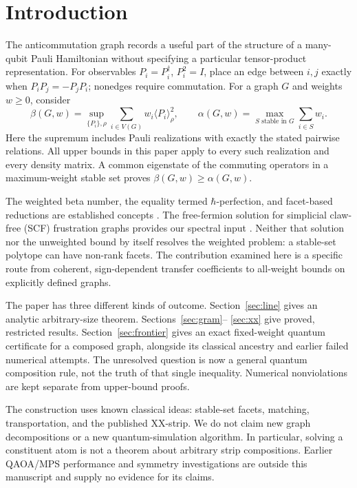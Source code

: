 \documentclass[11pt,a4paper]{article}
\theoremstyle{remark}\newtheorem{remark}[theorem]{Remark}
\newcommand{\ev}[1]{\langle#1\rangle_\rho}
\begin{document}
\section{Introduction}
The anticommutation graph records a useful part of the structure of a
many-qubit Pauli Hamiltonian without specifying a particular tensor-product
representation. For observables $P_i=P_i^\dagger$, $P_i^2=I$, place an edge
between $i,j$ exactly when $P_iP_j=-P_jP_i$; nonedges require commutation.
For a graph $G$ and weights $w\geq0$, consider
\begin{equation}\label{eq:beta}
 \beta(G,w)=\sup_{\{P_i\},\rho}\sum_{i\in V(G)}w_i\ev{P_i}^2,
 \qquad \alpha(G,w)=\max_{S\text{ stable in }G}\sum_{i\in S}w_i.
\end{equation}
Here the supremum includes Pauli realizations with exactly the stated
pairwise relations. All upper bounds in this paper apply to every such
realization and every density matrix. A common eigenstate of the commuting
operators in a maximum-weight stable set proves $\beta(G,w)\geq\alpha(G,w)$.

The weighted beta number, the equality termed $\hbar$-perfection, and
facet-based reductions are established concepts \cite{xu}. The
free-fermion solution for simplicial claw-free (SCF) frustration graphs
provides our spectral input \cite{cem}. Neither that solution nor the
unweighted bound by itself resolves the weighted problem: a stable-set
polytope can have non-rank facets. The contribution examined here is a
specific route from coherent, sign-dependent transfer coefficients to
all-weight bounds on explicitly defined graphs.

The paper has three different kinds of outcome. Section~\ref{sec:line}
gives an analytic arbitrary-size theorem. Sections~\ref{sec:gram}--
\ref{sec:xx} give proved, restricted results. Section~\ref{sec:frontier}
gives an exact fixed-weight quantum certificate for a composed graph,
alongside its classical ancestry and earlier failed numerical attempts.
The unresolved question is now a general quantum composition rule, not
the truth of that single inequality. Numerical nonviolations are kept
separate from upper-bound proofs.

The construction uses known classical ideas: stable-set facets, matching,
transportation, and the published XX-strip. We do not claim new graph
decompositions or a new quantum-simulation algorithm. In particular,
solving a constituent atom is not a theorem about arbitrary strip
compositions. Earlier QAOA/MPS performance and symmetry investigations
are outside this manuscript and supply no evidence for its claims.
\end{document}
